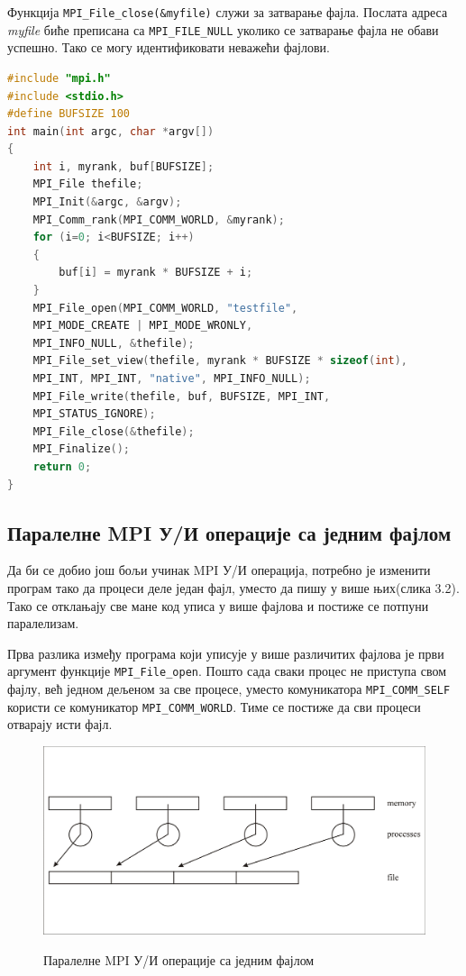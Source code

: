 Функција \texttt{MPI\_File\_close(\&myfile)} служи за затварање фајла. Послата адреса \textit{myfile} биће преписана са  \texttt{MPI\_FILE\_NULL} уколико се затварање фајла не обави успешно. Тако се могу идентификовати неважећи фајлови.

\begin{lstlisting}[style=nonumbers,frame=single,language=C, caption=MPI програм за паралелним MPI функцијама]
#include "mpi.h"
#include <stdio.h>
#define BUFSIZE 100
int main(int argc, char *argv[])
{
	int i, myrank, buf[BUFSIZE];
	MPI_File thefile;
	MPI_Init(&argc, &argv);
	MPI_Comm_rank(MPI_COMM_WORLD, &myrank);
	for (i=0; i<BUFSIZE; i++)
	{
		buf[i] = myrank * BUFSIZE + i;
	}
	MPI_File_open(MPI_COMM_WORLD, "testfile",
	MPI_MODE_CREATE | MPI_MODE_WRONLY,
	MPI_INFO_NULL, &thefile);
	MPI_File_set_view(thefile, myrank * BUFSIZE * sizeof(int),
	MPI_INT, MPI_INT, "native", MPI_INFO_NULL);
	MPI_File_write(thefile, buf, BUFSIZE, MPI_INT,
	MPI_STATUS_IGNORE);
	MPI_File_close(&thefile);
	MPI_Finalize();
	return 0;
}
\end{lstlisting}


\subsection{Паралелне MPI У/И операције са једним фајлом}

Да би се добио још бољи учинак MPI У/И операција, потребно је изменити програм тако да процеси деле један фајл, уместо да пишу у више њих(слика 3.2). Тако се отклањају све мане код уписа у више фајлова и постиже се потпуни паралелизам.

Прва разлика између програма који уписује у више различитих фајлова је први аргумент функције \texttt{MPI\_File\_open}. Пошто сада сваки процес не приступа свом фајлу, већ једном дељеном за све процесе, уместо комуникатора \texttt{MPI\_COMM\_SELF} користи се комуникатор  \texttt{MPI\_COMM\_WORLD}. Тиме се постиже да сви процеси отварају исти фајл.

\begin{figure}[h!]
  \centering
      \includegraphics[width=1\textwidth]{slike/paralel_i_o_single_file.png}\\[1cm]
  \caption{Паралелне MPI У/И операције са једним фајлом}
\end{figure}

